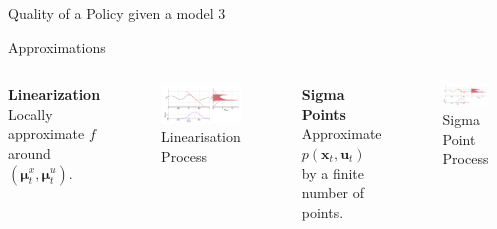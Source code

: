 \documentclass[10pt]{beamer}
\begin{document}
\begin{frame}{Quality of a Policy given a model 3 }

\begin{exampleblock}{Approximations}
\end{exampleblock}
\begin{columns}[T,onlytextwidth]
\textbf{Linearization}\\
Locally approximate $f$ around $(\bm{\mu}_{t}^{x},\bm{\mu}_{t}^{u})$. 
\begin{figure}[h]
\begin{center}
\includegraphics[scale=.18]{images/Linearisation.png} 
\end{center}
\caption{Linearisation Process}
\label{}
\end{figure}


\textbf{Sigma Points}\\
Approximate $p(\bm{x}_t,\bm{u}_t)$ by a finite number of points. 
\begin{figure}[h]
\begin{center}
\includegraphics[scale=.192]{images/SigmaPoint.png} 
\end{center}
\caption{Sigma Point Process}
\label{}
\end{figure}
\end{columns}
\end{frame}
\end{document}
